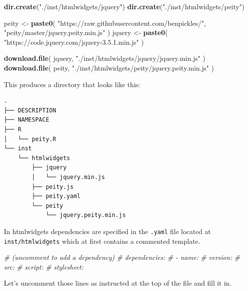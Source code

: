 \documentclass[
  10pt,
]{krantz}
\makeatletter
\newenvironment{Shaded}{\begin{snugshade}}{\end{snugshade}}
\newcommand{\CommentTok}[1]{\textcolor[rgb]{0.37,0.37,0.37}{\textit{#1}}}
\newcommand{\KeywordTok}[1]{\textcolor[rgb]{0.27,0.27,0.27}{\textbf{#1}}}
\newcommand{\NormalTok}[1]{#1}
\newcommand{\StringTok}[1]{\textcolor[rgb]{0.5,0.5,0.5}{#1}}
\newenvironment{kframe}{%
\medskip{}
\setlength{\fboxsep}{.8em}
 \def\at@end@of@kframe{}%
 \ifinner\ifhmode%
  \def\at@end@of@kframe{\end{minipage}}%
  \begin{minipage}{\columnwidth}%
 \fi\fi%
 \def\FrameCommand##1{\hskip\@totalleftmargin \hskip-\fboxsep
 \colorbox{shadecolor}{##1}\hskip-\fboxsep
     \hskip-\linewidth \hskip-\@totalleftmargin \hskip\columnwidth}%
 \MakeFramed {\advance\hsize-\width
   \@totalleftmargin\z@ \linewidth\hsize
   \@setminipage}}%
 {\par\unskip\endMakeFramed%
 \at@end@of@kframe}
\renewenvironment{Shaded}{\begin{kframe}}{\end{kframe}}
\makeatother
\begin{document}
\begin{Shaded}
\begin{Highlighting}[]
\KeywordTok{dir.create}\NormalTok{(}\StringTok{"./inst/htmlwidgets/jquery"}\NormalTok{)}
\KeywordTok{dir.create}\NormalTok{(}\StringTok{"./inst/htmlwidgets/peity"}\NormalTok{)}

\NormalTok{peity <{-}}\StringTok{ }\KeywordTok{paste0}\NormalTok{(}
  \StringTok{"https://raw.githubusercontent.com/benpickles/"}\NormalTok{,}
  \StringTok{"peity/master/jquery.peity.min.js"}
\NormalTok{)}
\NormalTok{jquery <{-}}\StringTok{ }\KeywordTok{paste0}\NormalTok{(}
  \StringTok{"https://code.jquery.com/jquery{-}3.5.1.min.js"}
\NormalTok{)}

\KeywordTok{download.file}\NormalTok{(}
\NormalTok{  jquery, }\StringTok{"./inst/htmlwidgets/jquery/jquery.min.js"}
\NormalTok{)}
\KeywordTok{download.file}\NormalTok{(}
\NormalTok{  peity, }\StringTok{"./inst/htmlwidgets/peity/jquery.peity.min.js"}
\NormalTok{)}
\end{Highlighting}
\end{Shaded}

This produces a directory that looks like this:

\begin{verbatim}
.
├── DESCRIPTION
├── NAMESPACE
├── R
│   └── peity.R
└── inst
    └── htmlwidgets
        ├── jquery
        │   └── jquery.min.js
        ├── peity.js
        ├── peity.yaml
        └── peity
            └── jquery.peity.min.js
\end{verbatim}

In htmlwidgets dependencies are specified in the \texttt{.yaml} file located at \texttt{inst/htmlwidgets} which at first contains a commented template.

\begin{Shaded}
\begin{Highlighting}[]
\CommentTok{\# (uncomment to add a dependency)}
\CommentTok{\# dependencies:}
\CommentTok{\#  {-} name:}
\CommentTok{\#    version:}
\CommentTok{\#    src:}
\CommentTok{\#    script:}
\CommentTok{\#    stylesheet:}
\end{Highlighting}
\end{Shaded}

Let's uncomment those lines as instructed at the top of the file and fill it in.
\end{document}

